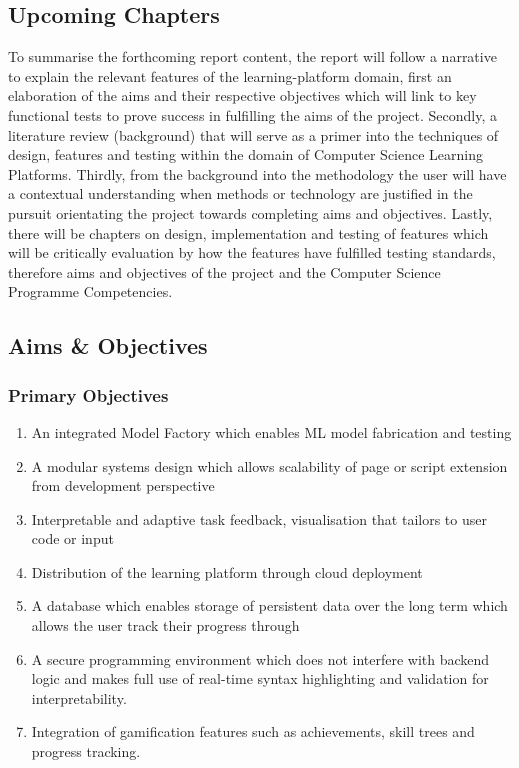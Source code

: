 \documentclass{article}
\begin{document}
\subsection{Upcoming Chapters}
To summarise the forthcoming report content, the report will follow a narrative to explain the relevant features of the learning-platform domain, first an elaboration of the aims and their respective objectives which will link to key functional tests to prove success in fulfilling the aims of the project. Secondly, a literature review (background) that will serve as a primer into the techniques of design, features and testing within the domain of Computer Science Learning Platforms. Thirdly, from the background into the methodology the user will have a contextual understanding when methods or technology are justified in the pursuit orientating the project towards completing aims and objectives. Lastly, there will be chapters on design, implementation and testing of features which will be critically evaluation by how the features have fulfilled testing standards, therefore aims and objectives of the project and the Computer Science Programme Competencies.


\subsection{Aims \& Objectives} %
\subsubsection{Primary Objectives} %
\begin{enumerate}
    \item An integrated Model Factory which enables ML model fabrication and testing
    \item A modular systems design which allows scalability of page or script extension from development perspective
    \item Interpretable and adaptive task feedback, visualisation that tailors to user code or input
    \item Distribution of the learning platform through cloud deployment
    \item A database which enables storage of persistent data over the long term which allows the user track their progress through
    \item A secure programming environment which does not interfere with backend logic and makes full use of real-time syntax highlighting and validation for interpretability.
    \item Integration of gamification features such as achievements, skill trees and progress tracking.
\end{enumerate}
\end{document}
